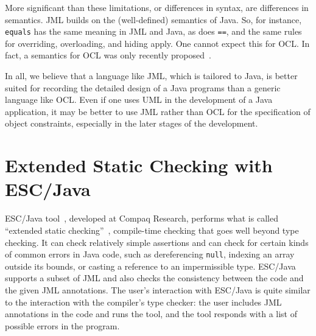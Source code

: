 More significant than these limitations, or differences in syntax, are
differences in semantics.  JML builds on the (well-defined) semantics
of Java. So, for instance, {\tt equals} has the same meaning in JML
and Java, as does {\tt ==}, and the same rules for overriding,
overloading, and hiding apply.  One cannot expect this for OCL\@.  In
fact, a semantics for OCL was only recently
proposed~\cite{brucker.ea:proposal:2002}.

In all, we believe that a language like JML, which is tailored to
Java, is better suited for recording the detailed design of a Java
programs than a generic language like OCL\@.  Even if one uses UML in
the development of a Java application, it may be better to use JML
rather than OCL for the specification of object constraints,
especially in the later stages of the development.




\section{Extended Static Checking with ESC/Java}
\label{escjava}

ESC/Java tool~\cite{Flanagan-Et-Al02}, developed at Compaq Research,
performs what is called ``extended static
checking''~\cite{ESC:Overview,10yearsESC},
compile-time checking that goes well beyond type checking.  It can
check relatively simple assertions and can check for certain kinds of
common errors in Java code, such as dereferencing \texttt{null},
indexing an array outside its bounds, or casting a reference to an
impermissible type.  ESC/Java supports a subset of JML and also checks
the consistency between the code and the given JML annotations.  The
user's interaction with ESC/Java is quite similar to the interaction
with the compiler's type checker: the user includes JML annotations in
the code and runs the tool, and the tool responds with a list of
possible errors in the program.

